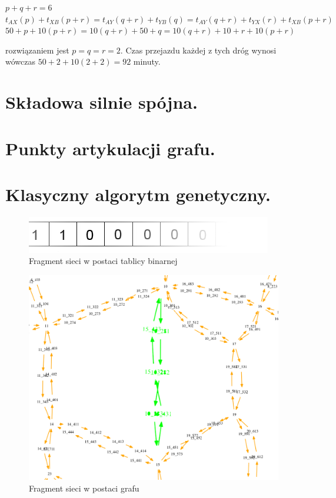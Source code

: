 \documentclass[twoside,12pt]{report}
\begin{document}
\begin{center}
$p+q+r = 6 $
$t_{AX}(p)+t_{XB}(p+r) = t_{AY}(q+r) + t_{YB}(q) = t_{AY}(q+r)+t_{YX}(r)+t_{XB}(p+r)$
\newline
$50+p+10(p+r) = 10(q+r)+50+q = 10(q+r)+ 10 + r + 10(p+r)$
\end{center}
rozwiązaniem jest $p=q=r=2$.
Czas przejazdu każdej z tych dróg wynosi wówczas $50+2+10(2+2)=92$ minuty.

\section{Składowa silnie spójna.}


\section{Punkty artykulacji grafu.}


\section{Klasyczny algorytm genetyczny.}


\begin{figure}[ht]
\includegraphics[width=\textwidth]{img/bool}
\caption{Fragment sieci w postaci tablicy binarnej }
\end{figure}

\begin{figure}[ht]
\includegraphics[width=\textwidth]{img/bool-efect}
\caption{Fragment sieci w postaci grafu}
\end{figure}
\end{document}
